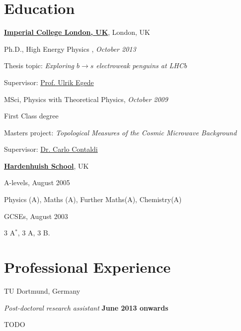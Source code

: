 \documentclass[10pt]{article}
\renewenvironment{compactitem}{
  \begin{list}{}{
    \setlength{\leftmargin}{1.5em}
  }
}{
  \end{list}
}
\begin{document}
\section*{Education}
%
\href{http://www.imperial.ac.uk/}{\textbf{Imperial College London, UK}},
London, UK
\begin{compactitem}
\item Ph.D., High Energy Physics , \textit{October 2013}
        \begin{compactitem}
        \item Thesis topic: \emph{Exploring $b\rightarrow s$ electroweak penguins at LHCb}
        \item Supervisor:
              \href{http://www3.imperial.ac.uk/people/u.egede}
                   {Prof. Ulrik Egede}
        \end{compactitem}
\item MSci, {Physics with Theoretical Physics}, \textit{October 2009}
        \begin{compactitem}
        \item First Class degree
        \item Masters project: \emph{Topological Measures of the Cosmic Microwave Background}
        \item Supervisor:
              \href{http://www3.imperial.ac.uk/people/c.contaldi}
                   {Dr. Carlo Contaldi}
        \end{compactitem}
\end{compactitem}
\href{http://www.hardenhuish.wilts.sch.uk/hardenhuish/site/}{\textbf{Hardenhuish School}}, UK
\begin{compactitem}
\item A-levels, August 2005
        \begin{compactitem}
        \item Physics (A), Maths (A), Further Maths(A), Chemistry(A)
        \end{compactitem}
\item GCSEs, August 2003
        \begin{compactitem}
        \item 3 A$^{*}$, 3 A, 3 B.
        \end{compactitem}
\end{compactitem}

\section*{Professional Experience}
TU Dortmund, Germany
\begin{compactitem}
\item \textit{Post-doctoral research assistant}%
        \hfill \textbf{June 2013 onwards}
\begin{compactitem}
\item TODO
\end{compactitem}
\end{compactitem}
\end{document}
